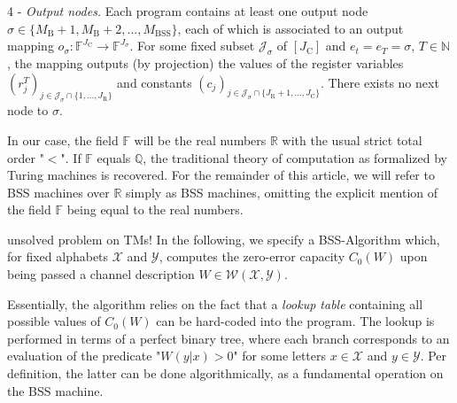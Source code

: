 \documentclass[conference]{IEEEtran}
\def\X{{\mathcal X}}
\def\Y{{\mathcal Y}}
\def\J{{\mathcal J}}
\def\W{{\mathcal W}}
\def\NN{{\mathbb N}}
\def\RR{{\mathbb R}}
\def\ZZ{{\mathbb Z}}
\def\FF{{\mathbb F}}
\newcommand{\BSS}{\mathrm{BSS}}
\begin{document}
	4 - \emph{Output nodes.} Each program contains at least one output node \(\sigma \in \{M_{\mathrm{B}} + 1, M_{\mathrm{B}} + 2,\ldots, M_\BSS\}\), 
		each of which is associated to an output mapping
		\(	o_\sigma : \FF^{J_{\mathrm{C}}}\rightarrow \FF^{J_{\sigma}}.
		\)
		For some fixed subset \(\J_\sigma\) of \([J_\mathrm{C}]\) and \(e_t = e_T = \sigma\), \(T\in\NN\), the mapping outputs (by projection) the values of the 
		register variables \((r_j^T)_{j\in \J_\sigma \cap \{1,\ldots,J_\mathrm{R}\}}\) and constants \((c_j)_{j\in \J_\sigma \cap \{J_\mathrm{R}+1,\ldots,J_\mathrm{C}\}}\). 
		There exists no next node to \(\sigma\).

	In our case, the field \(\FF\) will be the real numbers \(\RR\) with the usual strict total order "\(<\)". If \(\FF\) equals \(\mathbb{Q}\),
	the traditional theory of computation as formalized by Turing machines is recovered. For the remainder of this article, we will refer to BSS machines over \(\RR\) 
	simply as BSS machines, omitting the explicit mention of the field \(\FF\) being equal to the real numbers. 

	{\color{red} unsolved problem on TMs!}
	\noindent In the following, we specify a BSS-Algorithm which, for fixed alphabets \(\X\) and \(\Y\), computes the zero-error capacity \(C_0(W)\) 
	upon being passed a channel description \(W \in \W(\X,\Y)\). 

	Essentially, the algorithm relies on the fact that a \emph{lookup table} containing all possible values of \(C_0(W)\) can be hard-coded into the program. The lookup is performed in 
	terms of a perfect binary tree, where each branch corresponds to an evaluation of the predicate "\(W(y|x) > 0\)" for some letters \(x\in\X\) and \(y\in\Y\). Per definition, the latter 
	can be done algorithmically, as a fundamental operation on the BSS machine.
\end{document}
